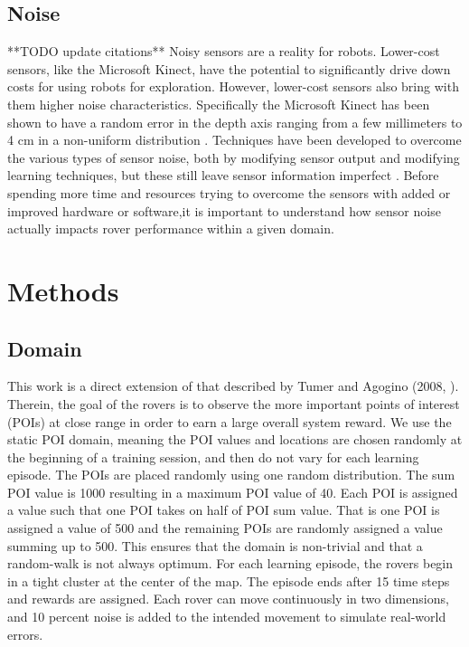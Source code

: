 \documentclass[letterpaper, 10 pt, conference]{ieeeconf}  %
\begin{document}
\subsection{Noise}
**TODO update citations**
Noisy sensors are a reality for robots. Lower-cost sensors, like the Microsoft Kinect, have the potential to significantly drive down costs for using robots for exploration. However, lower-cost sensors also bring with them higher noise characteristics. Specifically the Microsoft Kinect has been shown to have a random error in the depth axis ranging from a few millimeters to 4 cm in a non-uniform distribution \cite{khoshelham2012accuracy,nguyen2012modeling}. Techniques have been developed to overcome the various types of sensor noise, both by modifying sensor output and modifying learning techniques, but these still leave sensor information imperfect \cite{nguyen2012modeling,hu2010distributed}. Before spending more time and resources trying to overcome the sensors with added or improved hardware or software,it is important to understand how sensor noise actually impacts rover performance within a given domain.


\section{Methods}
\subsection{Domain}
This work is a direct extension of that described by Tumer and Agogino
(2008, \cite{agogino2008analyzing}). Therein, the goal of the rovers is to observe the more
important points of interest (POIs) at close range in order to earn a
large overall system reward. We use the static POI domain, meaning the POI values and locations are chosen randomly at the
beginning of a training session, and then do not vary for each learning episode. The POIs are placed randomly using one random distribution. The sum POI value is 1000 resulting in a maximum POI value of 40.  Each POI is assigned a value such that one POI takes on half of POI sum value.  That is one POI is assigned a value of 500 and the remaining POIs are randomly assigned a value summing up to 500.  This ensures that the domain is non-trivial and that a random-walk is not always optimum.  For each learning episode, the rovers begin in a tight cluster at the center of the map. The episode
ends after 15 time steps and rewards are assigned. Each rover can move
continuously in two dimensions, and 10 percent noise is added to the
intended movement to simulate real-world errors.
\end{document}
